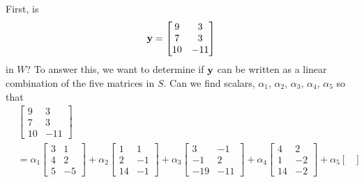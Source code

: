 \documentclass{ximera}
\begin{document}
\begin{example}[A subspace of $M_{32}$]
  First, is
  \[
    \mathbf{y}=\begin{bmatrix}
      9 & 3 \\ 7 & 3 \\ 10 & -11
    \end{bmatrix}
  \]
  in $W$?  To answer this, we want to determine if $\mathbf{y}$ can be
  written as a linear combination of the five matrices in $S$.  Can we
  find scalars, $\alpha_1,\,\alpha_2,\,\alpha_3,\,\alpha_4,\,\alpha_5$
  so that
  \begin{align*}
    &\begin{bmatrix}
      9 & 3 \\ 7&3 \\ 10 & -11
    \end{bmatrix}\\
    &=
      \alpha_1
      \begin{bmatrix}
        3 & 1 \\ 4 & 2 \\ 5 & -5
      \end{bmatrix}
                              +\alpha_2
                              \begin{bmatrix}
                                1 & 1 \\ 2 & -1 \\ 14 & -1
                              \end{bmatrix}
                                                        +\alpha_3
                                                        \begin{bmatrix}
                                                          3 & -1 \\ -1 & 2 \\ -19 & -11
                                                        \end{bmatrix}
                                                                                    +\alpha_4
                                                                                    \begin{bmatrix}
                                                                                      4 & 2 \\ 1 & -2 \\ 14 & -2
                                                                                    \end{bmatrix}
                                                                                                              +\alpha_5
                                                                                                              \begin{bmatrix}

\end{bmatrix}
\end{align*}
\end{example}
\end{document}
